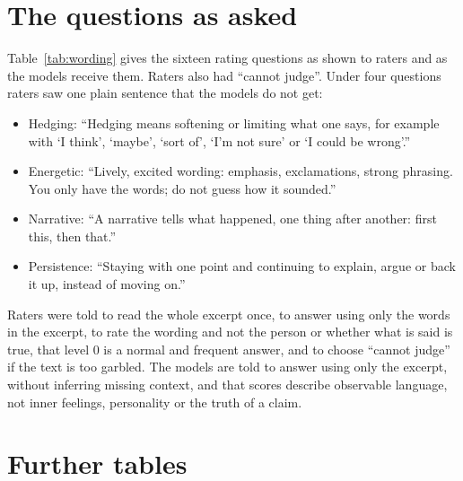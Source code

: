 \section{The questions as asked}\label{app:wording}

Table~\ref{tab:wording} gives the sixteen rating questions as shown to raters and as the models receive them.
Raters also had ``cannot judge''. Under four questions raters saw one plain sentence that the models do not get:
\begin{itemize}
\item Hedging: ``Hedging means softening or limiting what one says, for example with `I think', `maybe', `sort
  of', `I'm not sure' or `I could be wrong'.''
\item Energetic: ``Lively, excited wording: emphasis, exclamations, strong phrasing. You only have the words; do
  not guess how it sounded.''
\item Narrative: ``A narrative tells what happened, one thing after another: first this, then that.''
\item Persistence: ``Staying with one point and continuing to explain, argue or back it up, instead of moving
  on.''
\end{itemize}
Raters were told to read the whole excerpt once, to answer using only the words in the excerpt, to rate the
wording and not the person or whether what is said is true, that level 0 is a normal and frequent answer, and to
choose ``cannot judge'' if the text is too garbled. The models are told to answer using only the excerpt, without
inferring missing context, and that scores describe observable language, not inner feelings, personality or the
truth of a claim.

\begingroup
\setlength{\LTcapwidth}{\textwidth}

\endgroup

\section{Further tables}\label{app:tables}

\begin{table}[H]\centering
\caption{Second study, the sixteen questions: ratings and ``cannot judge'' (C.j.), the standard deviation of
raters' levels and of the rest in scale points, the reliability of one rating and of the mean of five, and each
model's correlation with the mean of five. \textsuperscript{n}: not rated in the first study.}\label{tab:s2questions}

\end{table}

